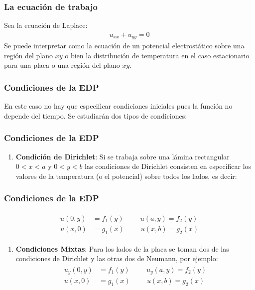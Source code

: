 \documentclass[12pt]{beamer}
\begin{document}
\begin{frame}
\frametitle{La ecuación de trabajo}
Sea la ecuación de Laplace:
\begin{align*}
u_{xx} + u_{yy} = 0
\end{align*}
Se puede interpretar como la ecuación de un potencial electrostático sobre una región del plano $xy$ o bien la distribución de temperatura en el caso estacionario para una placa o una región del plano $xy$.
\end{frame}
\begin{frame}
\frametitle{Condiciones de la EDP}
En este caso no hay que especificar condiciones iniciales pues la función no depende del tiempo. Se estudiarán dos tipos de condiciones:
\end{frame}
\begin{frame}
\frametitle{Condiciones de la EDP}
\begin{enumerate}
\item \textbf{Condición de Dirichlet}: Si se trabaja sobre una lámina rectangular $0 < x < a$ y $0 < y < b$ las condiciones de Dirichlet consisten en especificar los valores de la temperatura (o el potencial) sobre todos los lados, es decir:
\seti
\end{enumerate}
\end{frame}
\begin{frame}
\frametitle{Condiciones de la EDP}
\begin{align}
\begin{aligned}
u(0, y) &= f_{1}(y) \hspace{1cm} u(a, y) = f_{2}(y) \\
u(x, 0) &= g_{1}(x) \hspace{1cm} u(x, b) = g_{2}(x)
\end{aligned}
\label{eq:ecuacion_06_02_05}
\end{align}
\end{frame}
\begin{frame}
\begin{enumerate}
\conti    
\item \textbf{Condiciones Mixtas}: Para los lados de la placa se toman dos de las condiciones de Dirichlet y las otras dos de Neumann, por ejemplo:
\begin{align}
\begin{aligned}
u_{y}(0, y) &= f_{1}(y) \hspace{1cm} u_{y}(a, y) = f_{2}(y) \\
u(x, 0) &= g_{1}(x) \hspace{1cm} u(x, b) = g_{2}(x)
\end{aligned}
\label{eq:ecuacion_06_01_06}
\end{align}
\end{enumerate}
\end{frame}
\end{document}
